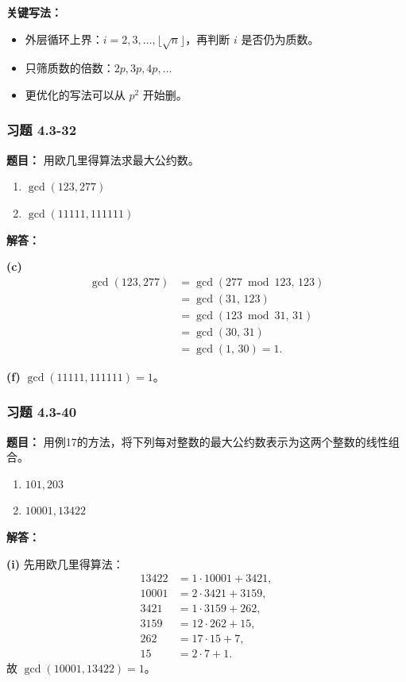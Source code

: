 \documentclass[11pt,UTF8]{article}
\begin{document}
\textbf{关键写法：}
\begin{itemize}
    \item 外层循环上界：$i=2,3,\dots,\lfloor\sqrt{n}\rfloor$，再判断 $i$ 是否仍为质数。
    \item 只筛质数的倍数：$2p,3p,4p,\dots$
    \item 更优化的写法可以从 $p^2$ 开始删。
\end{itemize}

\subsubsection*{习题 4.3-32}
\textbf{题目：} 用欧几里得算法求最大公约数。
\begin{enumerate}
    \item[(c)] $\gcd(123,277)$
    \item[(f)] $\gcd(11111,111111)$
\end{enumerate}

\textbf{解答：}

\textbf{(c)}
\begin{align*}
\gcd(123,277) &= \gcd(277\bmod 123,\,123) \\
&= \gcd(31,\,123) \\
&= \gcd(123\bmod 31,\,31) \\
&= \gcd(30,\,31) \\
&= \gcd(1,\,30) = \boxed{1}.
\end{align*}

\textbf{(f)} $\gcd(11111,111111)=\boxed{1}$。

\subsubsection*{习题 4.3-40}
\textbf{题目：} 用例17的方法，将下列每对整数的最大公约数表示为这两个整数的线性组合。
\begin{enumerate}
    \item[(e)] $101,203$
    \item[(i)] $10001,13422$
\end{enumerate}

\textbf{解答：}

\textbf{(i)} 先用欧几里得算法：
\begin{align*}
13422 &= 1\cdot 10001 + 3421,\\
10001 &= 2\cdot 3421 + 3159,\\
3421 &= 1\cdot 3159 + 262,\\
3159 &= 12\cdot 262 + 15,\\
262 &= 17\cdot 15 + 7,\\
15 &= 2\cdot 7 + 1.
\end{align*}
故 $\gcd(10001,13422)=1$。
\end{document}
